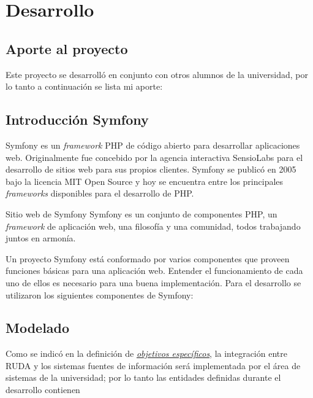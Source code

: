 
\section{Desarrollo}%
\label{sec:desarrollo}

\subsection{Aporte al proyecto}%
\label{ssub:aporte_al_proyecto}
Este proyecto se desarrolló en conjunto con otros alumnos de la universidad, por lo tanto a continuación se lista mi aporte:



\subsection{Introducción Symfony}%
\label{ssub:introduccion_symfony}
Symfony es un \textit{framework} PHP de código abierto para desarrollar aplicaciones web. Originalmente fue concebido por la
agencia interactiva SensioLabs para el desarrollo de sitios web para sus propios clientes. Symfony se publicó en 2005 bajo
la licencia MIT Open Source y hoy se encuentra entre los principales \textit{frameworks} disponibles para el desarrollo de PHP. \textcite{symfony-def}
\begin{aquote}{Sitio web de Symfony}
Symfony es un conjunto de componentes PHP, un \textit{framework} de aplicación web, una filosofía y una comunidad, todos trabajando juntos en armonía.
\end{aquote}
Un proyecto Symfony está conformado por varios componentes que proveen funciones básicas para una aplicación web. Entender
el funcionamiento de cada uno de ellos es necesario para una buena implementación. Para el desarrollo se utilizaron los siguientes componentes de Symfony:


\begin{itemize}
    
\end{itemize}
\newpage
\subsection{Modelado}%
\label{sub:modelado}
Como se indicó en la definición de \hyperref[ssub:objetivos_especificos]{\textit{objetivos específicos}}, la integración entre RUDA y los sistemas fuentes de información será implementada por el área de sistemas de la universidad; por lo tanto las entidades definidas durante el desarrollo contienen

